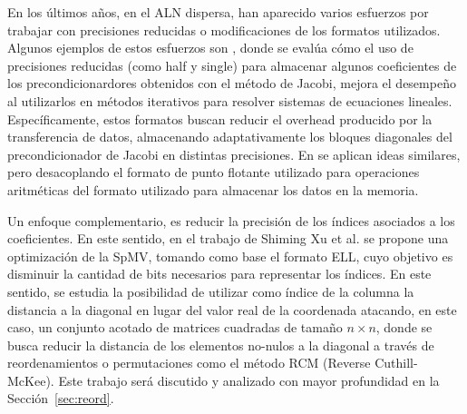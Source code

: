 En los últimos años, en el ALN dispersa, han aparecido varios esfuerzos por trabajar con precisiones reducidas o modificaciones de los formatos utilizados. Algunos ejemplos de estos esfuerzos son \cite{Anzt2018, Goebel2020}, donde se evalúa cómo el uso de precisiones reducidas (como half y single) para almacenar algunos coeficientes de los precondicionardores obtenidos con el método de Jacobi, mejora el desempeño al utilizarlos en métodos iterativos para resolver sistemas de ecuaciones lineales.
Específicamente, estos formatos buscan reducir el overhead producido por la transferencia de datos, almacenando adaptativamente los bloques diagonales del precondicionador de Jacobi en distintas precisiones.
En \cite{Grtzmacher2019, Grtzmacher2020} se aplican ideas similares, pero desacoplando el formato de punto flotante utilizado para operaciones aritméticas del formato utilizado para almacenar los datos en la memoria. %

Un enfoque complementario, es reducir la precisión de los índices asociados a los coeficientes. En este sentido, en el trabajo de Shiming Xu et al. \cite{Xu2010} se propone una optimización de la SpMV, tomando como base el formato ELL, cuyo objetivo es disminuir la cantidad de bits necesarios para representar los índices. En este sentido, se estudia la posibilidad de utilizar como índice de la columna la distancia a la diagonal en lugar del valor real de la coordenada atacando, en este caso, un conjunto acotado de matrices cuadradas de tamaño $n\times n$, donde se busca reducir la distancia de los elementos no-nulos a la diagonal a través de reordenamientos o permutaciones como el método RCM (Reverse Cuthill-McKee). Este trabajo será discutido y analizado con mayor profundidad en la Sección~\ref{sec:reord}.%




